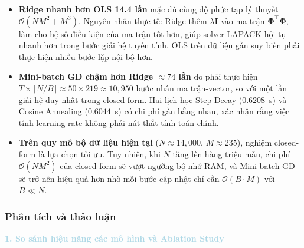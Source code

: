 \begin{itemize}[labelsep=10pt, leftmargin=2cm]
    \item \textbf{Ridge nhanh hơn OLS 14.4 lần} mặc dù cùng độ phức tạp lý thuyết
          $\mathcal{O}(NM^2 + M^3)$. Nguyên nhân thực tế: Ridge thêm $\lambda \mathbf{I}$
          vào ma trận $\boldsymbol{\Phi}^\top\boldsymbol{\Phi}$, làm cho hệ số điều kiện của
          ma trận tốt hơn, giúp solver LAPACK hội tụ nhanh hơn trong bước giải hệ tuyến tính.
          OLS trên dữ liệu gần suy biến phải thực hiện nhiều bước lặp nội bộ hơn.

    \item \textbf{Mini-batch GD chậm hơn Ridge $\approx 74$ lần} do phải thực hiện
          $T \times \lceil N/B \rceil \approx 50 \times 219 \approx 10{,}950$ bước
          nhân ma trận-vector, so với một lần giải hệ duy nhất trong closed-form. Hai lịch
          học Step Decay ($0.6208$~s) và Cosine Annealing ($0.6044$~s) có chi phí gần bằng
          nhau, xác nhận rằng việc tính learning rate không phải nút thắt tính toán chính.

    \item \textbf{Trên quy mô bộ dữ liệu hiện tại} ($N \approx 14{,}000$, $M \approx 235$),
          nghiệm closed-form là lựa chọn tối ưu. Tuy nhiên, khi $N$ tăng lên hàng triệu mẫu,
          chi phí $\mathcal{O}(NM^2)$ của closed-form sẽ vượt ngưỡng bộ nhớ RAM, và Mini-batch
          GD sẽ trở nên hiệu quả hơn nhờ mỗi bước cập nhật chỉ cần $\mathcal{O}(B \cdot M)$
          với $B \ll N$.
\end{itemize}

\subsubsection{Phân tích và thảo luận}

\noindent\textcolor{lightblue}{\textbf{1. So sánh hiệu năng các mô hình và Ablation Study}}

